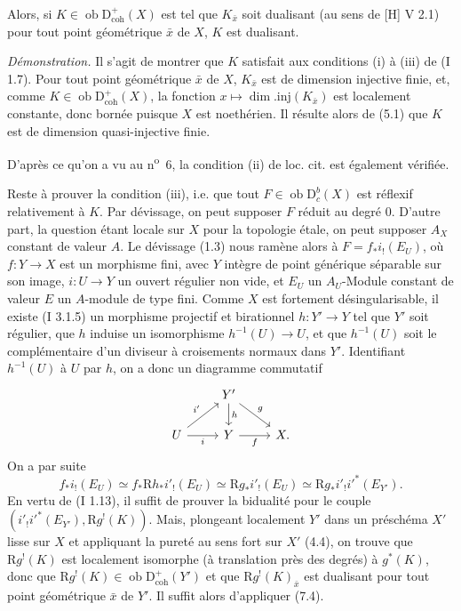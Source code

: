 \documentclass[11pt]{article}
\newcommand{\R}{\mathrm{R}}\newcommand{\RHomCore}{\mathrm{RHom}}
\newcommand{\D}{\mathrm{D}}
\newcommand{\ob}{\operatorname{ob}}
\providecommand{\ob}{\operatorname{ob}}
\providecommand{\R}{\mathrm R}
\begin{document}
Alors, si $K\in\ob\D^{+}_{\mathrm{coh}}(X)$ est tel que $K_{\bar{x}}$ soit dualisant (au sens de [H] V 2.1) pour tout point géométrique $\bar{x}$ de $X$, $K$ est dualisant.

\emph{Démonstration.} Il s'agit de montrer que $K$ satisfait aux conditions (i) à (iii) de (I 1.7). Pour tout point géométrique $\bar{x}$ de $X$, $K_{\bar{x}}$ est de dimension injective finie, et, comme $K\in\ob\D^{+}_{\mathrm{coh}}(X)$, la fonction $x\mapsto \dim.\mathrm{inj}(K_{\bar{x}})$ est localement constante, donc bornée puisque $X$ est noethérien. Il résulte alors de (5.1) que $K$ est de dimension quasi-injective finie.

D'après ce qu'on a vu au n\textsuperscript{o}~6, la condition (ii) de loc. cit. est également vérifiée.

Reste à prouver la condition (iii), i.e. que tout $F\in\ob\D_c^b(X)$ est réflexif relativement à $K$. Par dévissage, on peut supposer $F$ réduit au degré $0$. D'autre part, la question étant locale sur $X$ pour la topologie étale, on peut supposer $A_X$ constant de valeur $A$. Le dévissage (1.3) nous ramène alors à $F=f_*i_!(E_U)$, où $f:Y\to X$ est un morphisme fini, avec $Y$ intègre de point générique séparable sur son image, $i:U\to Y$ un ouvert régulier non vide, et $E_U$ un $A_U$-Module constant de valeur $E$ un $A$-module de type fini. Comme $X$ est fortement désingularisable, il existe (I 3.1.5) un morphisme projectif et birationnel $h:Y'\to Y$ tel que $Y'$ soit régulier, que $h$ induise un isomorphisme $h^{-1}(U)\to U$, et que $h^{-1}(U)$ soit le complémentaire d'un diviseur à croisements normaux dans $Y'$. Identifiant $h^{-1}(U)$ à $U$ par $h$, on a donc un diagramme commutatif
\[
\begin{tikzcd}
& Y' \arrow[d,"h"] \arrow[dr,"g"] & \\
U \arrow[ur,"i'"] \arrow[r,"i"'] & Y \arrow[r,"f"'] & X.
\end{tikzcd}
\]
On a par suite
\[
        f_*i_!(E_U)\simeq f_*\R h_* i'_!(E_U)\simeq \R g_* i'_!(E_U)\simeq \R g_* i'_! i'^*(E_{Y'}).
\]
En vertu de (I 1.13), il suffit de prouver la bidualité pour le couple $(i'_!i'^*(E_{Y'}),\R g^!(K))$. Mais, plongeant localement $Y'$ dans un préschéma $X'$ lisse sur $X$ et appliquant la pureté au sens fort sur $X'$ (4.4), on trouve que $\R g^!(K)$ est localement isomorphe (à translation près des degrés) à $g^*(K)$, donc que $\R g^!(K)\in\ob\D^{+}_{\mathrm{coh}}(Y')$ et que $\R g^!(K)_{\bar{x}}$ est dualisant pour tout point géométrique $\bar{x}$ de $Y'$. Il suffit alors d'appliquer (7.4).
\end{document}
